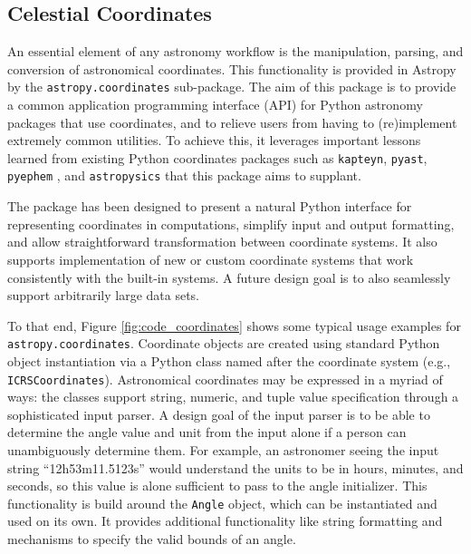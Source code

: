 \documentclass[traditabstract]{aa}
\begin{document}
\subsection{Celestial Coordinates}

\label{sec:coordinates}


An essential element of any astronomy workflow is the manipulation, parsing,
and conversion of astronomical coordinates. This functionality is provided in
Astropy by the \texttt{astropy.coordinates} sub-package. The aim of this
package is to provide a common application programming interface (API) for
Python astronomy packages that use coordinates, and to relieve users from
having to (re)implement extremely common utilities. To achieve this, it
leverages important lessons learned from existing Python coordinates packages
such as \texttt{kapteyn}, \texttt{pyast}, \texttt{pyephem} \citep{pyephem}, and
\texttt{astropysics} \citep{astropysics} that this package aims to supplant.

The package has been designed to present a natural Python interface for
representing coordinates in computations, simplify input and output formatting,
and allow straightforward transformation between coordinate systems. It also
supports implementation of new or custom coordinate systems that work
consistently with the built-in systems. A future design goal is to also
seamlessly support arbitrarily large data sets.

To that end, Figure \ref{fig:code_coordinates} shows some typical usage
examples for \texttt{astropy.coordinates}. Coordinate objects are created using
standard Python object instantiation via a Python class named after the
coordinate system (e.g., \texttt{ICRSCoordinates}). Astronomical coordinates
may be expressed in a myriad of ways: the classes support string, numeric, and
tuple value specification through a sophisticated input parser. A design goal
of the input parser is to be able to determine the angle value and unit from
the input alone if a person can unambiguously determine them. For example, an
astronomer seeing the input string ``12h53m11.5123s'' would understand the
units to be in hours, minutes, and seconds, so this value is alone sufficient
to pass to the angle initializer. This functionality is build around the
\texttt{Angle} object, which can be instantiated and used on its own. It
provides additional functionality like string formatting and mechanisms to
specify the valid bounds of an angle.
\end{document}
